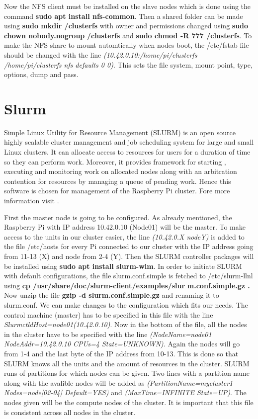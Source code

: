 \documentclass[../Head/Report.tex]{subfiles}
\begin{document}
Now the NFS client must be installed on the slave nodes which is done using the command \textbf{sudo apt install nfs-common}. Then a shared folder can be made using \textbf{sudo mkdir /clusterfs} with owner and permissions changed using \textbf{sudo chown nobody.nogroup} \textbf{/clusterfs} and \textbf{sudo chmod -R 777 /clusterfs}. To make the NFS share to mount automtically when nodes boot, the /etc/fstab file should be changed with the line \textit{(10.42.0.10:/home/pi/clusterfs /home/pi/clusterfs nfs defaults 0 0)}. This sets the file system, mount point, type, options, dump and pass. \cite{NFS}

\section{Slurm}
\label{sec:slurm}

Simple Linux Utility for Resource Management (SLURM) is an open source highly scalable cluster management and job scheduling system for large and small Linux clusters. It can allocate access to resources for users for a duration of time so they can perform work. Moreover, it provides framework for starting , executing and monitoring work on allocated nodes along with an arbitration contention for resources by managing a queue of pending work. Hence this software is chosen for management of the Raspberry Pi cluster. Fore more information visit \cite{SLURM}. 

First the master node is going to be configured. As already mentioned, the Raspberry Pi with IP address 10.42.0.10 (Node01) will be the master. To make access to the units in our cluster easier, the line \textit{(10.42.0.X nodeY)} is added to the file /etc/hosts for every Pi connected to our cluster with the IP address going from 11-13 (X) and node from 2-4 (Y). Then the SLURM controller packages will be installed using \textbf{sudo apt install slurm-wlm}. In order to initiate SLURM with default configurations, the file slurm.conf.simple is fetched to /etc/slurm-llnl using \textbf{cp /usr/share/doc/slurm-client/examples/slur} \textbf{m.conf.simple.gz .} Now unzip the file \textbf{gzip -d slurm.conf.simple.gz} and renaming it to slurm.conf. We can make changes to the configuration which fits our needs. The control machine (master) has to be specified in this file with the line \textit{ SlurmctldHost=node01(10.42.0.10)}. Now in the bottom of the file, all the nodes in the cluster have to be specified with the line \textit{(NodeName=node01 NodeAddr=10.42.0.10 CPUs=4 State=UNKNOWN)}. Again the nodes will go from 1-4 and the last byte of the IP address from 10-13. This is done so that SLURM knows all the units and the amount of resources in the cluster. SLURM runs of partitions for which nodes can be given. Two lines with a partition name along with the avalible nodes will be added as \textit{(PartitionName=mycluster1 Nodes=node[02-04] Default=YES)} and \textit{(MaxTime=INFINITE State=UP)}. The nodes given will be the compute nodes of the cluster. It is important that this file is consistent across all nodes in the cluster.    
\end{document}
